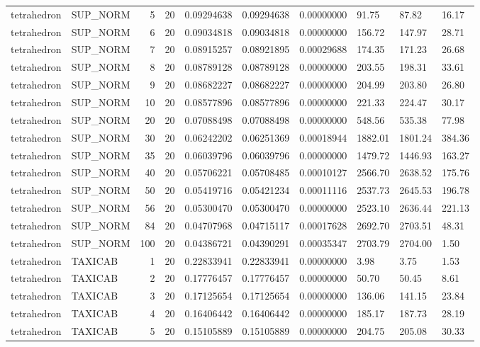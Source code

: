 \begin{longtable}{llrrllllll}
tetrahedron & SUP\_NORM & 5 & 20 & 0.09294638 & 0.09294638 & 0.00000000 & 91.75 & 87.82 & 16.17 \\
tetrahedron & SUP\_NORM & 6 & 20 & 0.09034818 & 0.09034818 & 0.00000000 & 156.72 & 147.97 & 28.71 \\
tetrahedron & SUP\_NORM & 7 & 20 & 0.08915257 & 0.08921895 & 0.00029688 & 174.35 & 171.23 & 26.68 \\
tetrahedron & SUP\_NORM & 8 & 20 & 0.08789128 & 0.08789128 & 0.00000000 & 203.55 & 198.31 & 33.61 \\
tetrahedron & SUP\_NORM & 9 & 20 & 0.08682227 & 0.08682227 & 0.00000000 & 204.99 & 203.80 & 26.80 \\
tetrahedron & SUP\_NORM & 10 & 20 & 0.08577896 & 0.08577896 & 0.00000000 & 221.33 & 224.47 & 30.17 \\
tetrahedron & SUP\_NORM & 20 & 20 & 0.07088498 & 0.07088498 & 0.00000000 & 548.56 & 535.38 & 77.98 \\
tetrahedron & SUP\_NORM & 30 & 20 & 0.06242202 & 0.06251369 & 0.00018944 & 1882.01 & 1801.24 & 384.36 \\
tetrahedron & SUP\_NORM & 35 & 20 & 0.06039796 & 0.06039796 & 0.00000000 & 1479.72 & 1446.93 & 163.27 \\
tetrahedron & SUP\_NORM & 40 & 20 & 0.05706221 & 0.05708485 & 0.00010127 & 2566.70 & 2638.52 & 175.76 \\
tetrahedron & SUP\_NORM & 50 & 20 & 0.05419716 & 0.05421234 & 0.00011116 & 2537.73 & 2645.53 & 196.78 \\
tetrahedron & SUP\_NORM & 56 & 20 & 0.05300470 & 0.05300470 & 0.00000000 & 2523.10 & 2636.44 & 221.13 \\
tetrahedron & SUP\_NORM & 84 & 20 & 0.04707968 & 0.04715117 & 0.00017628 & 2692.70 & 2703.51 & 48.31 \\
tetrahedron & SUP\_NORM & 100 & 20 & 0.04386721 & 0.04390291 & 0.00035347 & 2703.79 & 2704.00 & 1.50 \\
tetrahedron & TAXICAB & 1 & 20 & 0.22833941 & 0.22833941 & 0.00000000 & 3.98 & 3.75 & 1.53 \\
tetrahedron & TAXICAB & 2 & 20 & 0.17776457 & 0.17776457 & 0.00000000 & 50.70 & 50.45 & 8.61 \\
tetrahedron & TAXICAB & 3 & 20 & 0.17125654 & 0.17125654 & 0.00000000 & 136.06 & 141.15 & 23.84 \\
tetrahedron & TAXICAB & 4 & 20 & 0.16406442 & 0.16406442 & 0.00000000 & 185.17 & 187.73 & 28.19 \\
tetrahedron & TAXICAB & 5 & 20 & 0.15105889 & 0.15105889 & 0.00000000 & 204.75 & 205.08 & 30.33 \\

\end{longtable}
